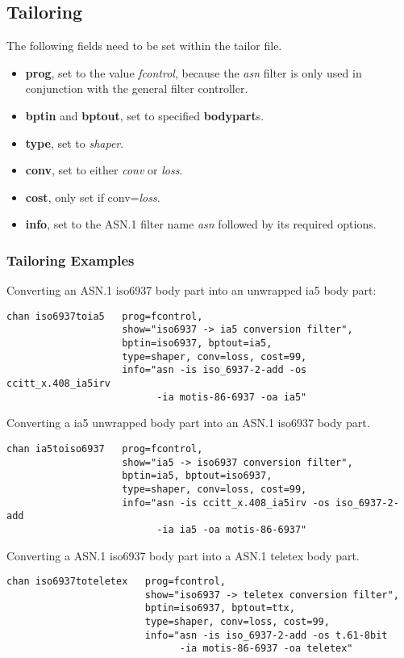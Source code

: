 \subsection {Tailoring}
\medskip

\noindent The following fields need to be set within the tailor file.
\begin {itemize}
\item {\bf prog}, set to the value {\em fcontrol},
because the {\em asn} filter is only used in conjunction 
with the general filter controller. 
\item {\bf bptin} and {\bf bptout}, set to specified {\bf bodypart}s.
\item {\bf type}, set to {\em shaper}.
\item {\bf conv}, set to either {\em conv} or {\em loss}.
\item {\bf cost}, only set if conv={\em loss}.
\item {\bf info}, set to the ASN.1 filter name {\em asn} followed 
by its required options.
\end {itemize}

\bigskip
\subsubsection {Tailoring Examples}
\bigskip

 Converting an ASN.1 iso6937 body part into an 
unwrapped ia5 body part:

\begin{verbatim}
chan iso6937toia5   prog=fcontrol,
                    show="iso6937 -> ia5 conversion filter",
                    bptin=iso6937, bptout=ia5,
                    type=shaper, conv=loss, cost=99,
                    info="asn -is iso_6937-2-add -os ccitt_x.408_ia5irv
                          -ia motis-86-6937 -oa ia5"
\end{verbatim}


\clearpage
{} Converting a ia5 unwrapped body part into an 
ASN.1 iso6937 body part.

\begin{verbatim}
chan ia5toiso6937   prog=fcontrol,
                    show="ia5 -> iso6937 conversion filter",
                    bptin=ia5, bptout=iso6937,
                    type=shaper, conv=loss, cost=99,
                    info="asn -is ccitt_x.408_ia5irv -os iso_6937-2-add
                          -ia ia5 -oa motis-86-6937"
\end{verbatim}



\bigskip\bigskip
{} Converting a ASN.1 iso6937 body part into a 
ASN.1 teletex body part.

\begin{verbatim}
chan iso6937toteletex	prog=fcontrol,
                        show="iso6937 -> teletex conversion filter",
                        bptin=iso6937, bptout=ttx,
                        type=shaper, conv=loss, cost=99,
                        info="asn -is iso_6937-2-add -os t.61-8bit
                              -ia motis-86-6937 -oa teletex"
\end{verbatim}


